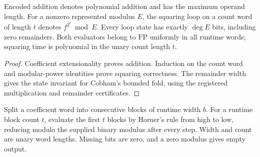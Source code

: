 \begin{theorem}
  \label{thm:lowerbounds-algebraic-bit-frobenius}
  \leanok
  Encoded addition denotes polynomial addition and has the maximum
  operand length. For a nonzero represented modulus $E$, the squaring
  loop on a count word of length $t$ denotes $f^{2^t}\bmod E$.
  Every loop state has exactly $\deg E$ bits, including zero remainders.
  Both evaluators belong to $\mathrm{FP}$ uniformly in all runtime
  words; squaring time is polynomial in the unary count length $t$.
\end{theorem}
\begin{proof}
  \leanok
  Coefficient extensionality proves addition. Induction on the count
  word and modular-power identities prove squaring correctness.
  The remainder width gives the state invariant for Cobham's bounded
  fold, using the registered multiplication and remainder certificates.
\end{proof}

\begin{definition}
  \label{def:lowerbounds-algebraic-bit-horner}
  \leanok
  Split a coefficient word into consecutive blocks of runtime width
  $b$. For a runtime block count $t$, evaluate the first $t$ blocks
  by Horner's rule from high to low, reducing modulo the supplied
  binary modulus after every step. Width and count are unary word
  lengths. Missing bits are zero, and a zero modulus gives empty output.
\end{definition}

